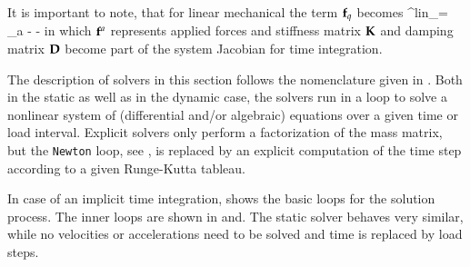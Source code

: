 It is important to note, that for linear mechanical the term $\mathbf{f}_q$ becomes
\be
  \fv^{lin}_\SO = \fv_a - \Km \qv - \Dm \dot \qv
\ee
in which $\mathbf{f}^a$ represents applied forces and stiffness matrix $\mathbf{K}$ and damping matrix $\mathbf{D}$ become part of the system Jacobian for time integration.

The description of solvers in this section follows the nomenclature given in .
Both in the static as well as in the dynamic case, the solvers run in a loop to solve a nonlinear system of (differential and/or algebraic) equations over a given time or load interval. Explicit solvers only perform a factorization of the mass matrix, but the \texttt{Newton} loop, see , is replaced by an explicit computation of the time step according to a given Runge-Kutta tableau.

In case of an implicit time integration,  shows the basic loops for the solution process. The inner loops are shown in  and.
The static solver behaves very similar, while no velocities or accelerations need to be solved and time is replaced by load steps.

